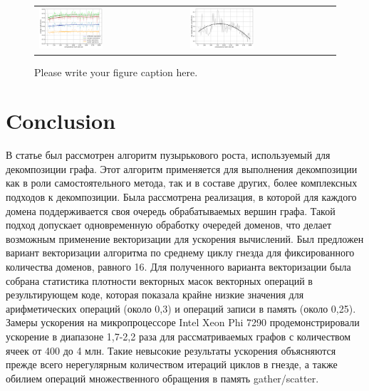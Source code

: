 \documentclass[
11pt,%
tightenlines,%
twoside,%
onecolumn,%
nofloats,%
nobibnotes,%
nofootinbib,%
superscriptaddress,%
noshowpacs,%
centertags]%
{revtex4}
\begin{document}
\begin{figure}[h]
\setcaptionmargin{5mm}
\onelinecaptionstrue  %
\begin{tabular}{ll}
\includegraphics[width=0.45\textwidth]{pics/chart_statistics_eng.png}
&
\includegraphics[width=0.45\textwidth]{pics/chart_speedup_eng.png}
\end{tabular}
\caption{Please write your figure caption here.}\label{fig:chart_speedup}
\end{figure}

\section{Conclusion}

В статье был рассмотрен алгоритм пузырькового роста, используемый для декомпозиции графа.
Этот алгоритм применяется для выполнения декомпозиции как в роли самостоятельного метода, так и в составе других, более комплексных подходов к декомпозиции.
Была рассмотрена реализация, в которой для каждого домена поддерживается своя очередь обрабатываемых вершин графа.
Такой подход допускает одновременную обработку очередей доменов, что делает возможным применение векторизации для ускорения вычислений.
Был предложен вариант векторизации алгоритма по среднему циклу гнезда для фиксированного количества доменов, равного 16.
Для полученного варианта векторизации была собрана статистика плотности векторных масок векторных операций в результирующем коде, которая показала крайне низкие значения для арифметических операций (около 0,3) и операций записи в память (около 0,25).
Замеры ускорения на микропроцессоре Intel Xeon Phi 7290 продемонстрировали ускорение в диапазоне 1,7-2,2 раза для рассматриваемых графов с количеством ячеек от 400 до 4 млн.
Такие невысокие результаты ускорения объясняются прежде всего нерегулярным количеством итераций циклов в гнезде, а также обилием операций множественного обращения в память gather/scatter.
\end{document}
